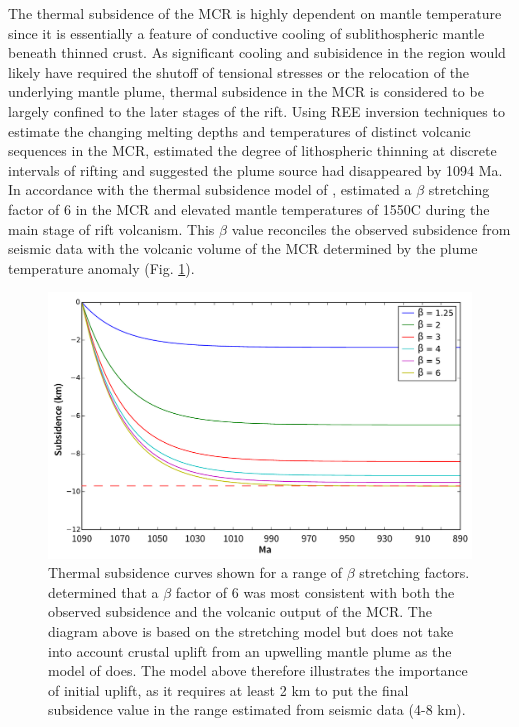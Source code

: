 \documentclass[12pt,letterpaper]{article}
\begin{document}
The thermal subsidence of the MCR is highly dependent on mantle temperature since it is essentially a feature of conductive cooling of sublithospheric mantle beneath thinned crust. As significant cooling and subisidence in the region would likely have required the shutoff of tensional stresses or the relocation of the underlying mantle plume, thermal subsidence in the MCR is considered to be largely confined to the later stages of the rift. Using REE inversion techniques to estimate the changing melting depths and temperatures of distinct volcanic sequences in the MCR, \cite{White1997a} estimated the degree of lithospheric thinning at discrete intervals of rifting and suggested the plume source had disappeared by 1094 Ma. In accordance with the thermal subsidence model of \cite{McKenzie1978a}, \cite{White1997a} estimated a $\beta$ stretching factor of 6 in the MCR and elevated mantle temperatures of 1550\textdegree C during the main stage of rift volcanism. This $\beta$ value reconciles the observed subsidence from seismic data with the volcanic volume of the MCR determined by the plume temperature anomaly (Fig. \ref{fig:therm_sub}).\par

\begin{figure}[H]
\noindent\includegraphics[width=\textwidth]{figures/general_thermal_sub.pdf}
\vspace{-30pt}
\caption{\footnotesize{Thermal subsidence curves shown for a range of $\beta$ stretching factors. \cite{White1997a} determined that a $\beta$ factor of 6 was most consistent with both the observed subsidence and the volcanic output of the MCR. The diagram above is based on the \cite{McKenzie1978a} stretching model but does not take into account crustal uplift from an upwelling mantle plume as the model of \cite{White1997a} does. The model above therefore illustrates the importance of initial uplift, as it requires at least 2 km to put the final subsidence value in the range estimated from seismic data (4-8 km).}}
\label{fig:therm_sub}
\end{figure}
\end{document}

